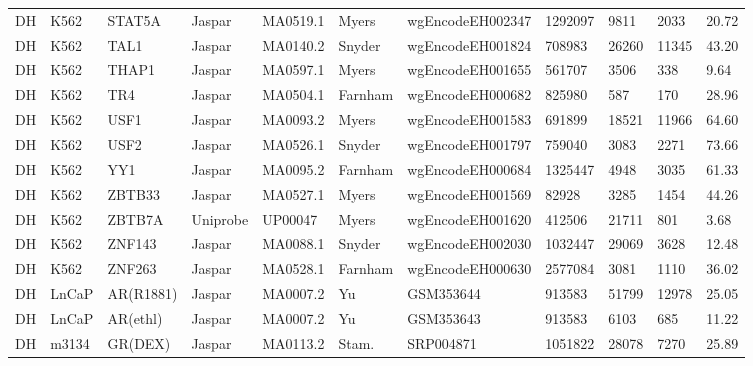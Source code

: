 {\begin{longtable}{p{0.2cm}p{1.1cm}p{1.0cm}p{1.0cm}p{1.0cm}p{1.0cm}p{2.3cm}p{1.0cm}p{0.8cm}p{0.8cm}p{0.8cm}}
DH & K562 & STAT5A & Jaspar & MA0519.1 & Myers & wgEncodeEH002347 & 1292097 & 9811 & 2033 & 20.72\\
DH & K562 & TAL1 & Jaspar & MA0140.2 & Snyder & wgEncodeEH001824 & 708983 & 26260 & 11345 & 43.20\\
DH & K562 & THAP1 & Jaspar & MA0597.1 & Myers & wgEncodeEH001655 & 561707 & 3506 & 338 & 9.64\\
DH & K562 & TR4 & Jaspar & MA0504.1 & Farnham & wgEncodeEH000682 & 825980 & 587 & 170 & 28.96\\
DH & K562 & USF1 & Jaspar & MA0093.2 & Myers & wgEncodeEH001583 & 691899 & 18521 & 11966 & 64.60\\
DH & K562 & USF2 & Jaspar & MA0526.1 & Snyder & wgEncodeEH001797 & 759040 & 3083 & 2271 & 73.66\\
DH & K562 & YY1 & Jaspar & MA0095.2 & Farnham & wgEncodeEH000684 & 1325447 & 4948 & 3035 & 61.33\\
DH & K562 & ZBTB33 & Jaspar & MA0527.1 & Myers & wgEncodeEH001569 & 82928 & 3285 & 1454 & 44.26\\
DH & K562 & ZBTB7A & Uniprobe & UP00047 & Myers & wgEncodeEH001620 & 412506 & 21711 & 801 & 3.68\\
DH & K562 & ZNF143 & Jaspar & MA0088.1 & Snyder & wgEncodeEH002030 & 1032447 & 29069 & 3628 & 12.48\\
DH & K562 & ZNF263 & Jaspar & MA0528.1 & Farnham & wgEncodeEH000630 & 2577084 & 3081 & 1110 & 36.02\\
DH & LnCaP & AR(R1881) & Jaspar & MA0007.2 & Yu & GSM353644 & 913583 & 51799 & 12978 & 25.05\\
DH & LnCaP & AR(ethl) & Jaspar & MA0007.2 & Yu & GSM353643 & 913583 & 6103 & 685 & 11.22\\
DH & m3134 & GR(DEX) & Jaspar & MA0113.2 & Stam. & SRP004871 & 1051822 & 28078 & 7270 & 25.89\\
        \hline
\end{longtable}
}

\clearpage

